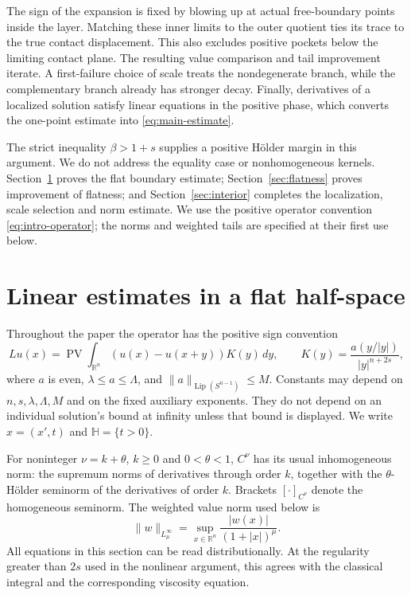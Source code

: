\documentclass[11pt]{article}
\numberwithin{equation}{section}
\newcommand{\R}{\mathbb R}
\newcommand{\Sn}{S^{n-1}}
\newcommand{\Lip}{\operatorname{Lip}}
\newcommand{\PV}{\operatorname{PV}}
\newcommand{\Hh}{\mathbb H}
\begin{document}
The sign of the expansion is fixed by blowing up at actual free-boundary
points inside the layer. Matching these inner limits to the outer quotient
ties its trace to the true contact displacement. This also excludes positive
pockets below the limiting contact plane. The resulting value comparison and
tail improvement iterate. A first-failure choice of scale treats the
nondegenerate branch, while the complementary branch already has stronger
decay. Finally, derivatives of a localized solution satisfy linear equations
in the positive phase, which converts the one-point estimate into
\eqref{eq:main-estimate}.

The strict inequality $\beta>1+s$ supplies a positive H\"older margin in
this argument. We do not address the equality case or nonhomogeneous kernels.
Section~\ref{sec:linear} proves the flat boundary estimate;
Section~\ref{sec:flatness} proves improvement of flatness; and
Section~\ref{sec:interior} completes the localization, scale selection and
norm estimate. We use the positive operator convention
\eqref{eq:intro-operator}; the norms and weighted tails are specified at
their first use below.

\section{Linear estimates in a flat half-space}\label{sec:linear}

Throughout the paper the operator has the positive sign convention
\begin{equation}\label{eq:operator}
 Lu(x)=\PV\int_{\R^n}(u(x)-u(x+y))K(y)\,dy,
 \qquad K(y)=\frac{a(y/|y|)}{|y|^{n+2s}},
\end{equation}
where $a$ is even, $\lambda\leq a\leq\Lambda$, and
$\|a\|_{\Lip(\Sn)}\leq M$. Constants may depend on $n,s,\lambda,\Lambda,M$
and on the fixed auxiliary exponents. They do not depend on an individual
solution's bound at infinity unless that bound is displayed.
We write $x=(x',t)$ and $\Hh=\{t>0\}$.

For noninteger $\nu=k+\theta$, $k\geq0$ and $0<\theta<1$, $C^\nu$
has its usual inhomogeneous norm: the supremum norms of derivatives through
order $k$, together with the $\theta$-H\"older seminorm of the derivatives of
order $k$. Brackets $[\cdot]_{C^\nu}$ denote the homogeneous seminorm.
The weighted value norm used below is
\[
 \|w\|_{L^\infty_\mu}=\sup_{x\in\R^n}
                 \frac{|w(x)|}{(1+|x|)^\mu}.
\]
All equations in this section can be read distributionally. At the regularity
greater than $2s$ used in the nonlinear argument, this agrees with the
classical integral and the corresponding viscosity equation.
\end{document}
